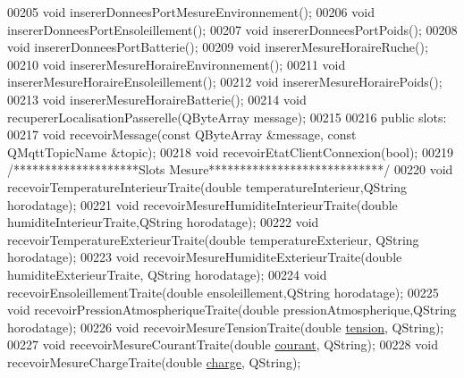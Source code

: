 \begin{DoxyCode}
00205         \textcolor{keywordtype}{void} insererDonneesPortMesureEnvironnement();
00206         \textcolor{keywordtype}{void} insererDonneesPortEnsoleillement();
00207         \textcolor{keywordtype}{void} insererDonneesPortPoids();
00208         \textcolor{keywordtype}{void} insererDonneesPortBatterie();
00209         \textcolor{keywordtype}{void} insererMesureHoraireRuche();
00210         \textcolor{keywordtype}{void} insererMesureHoraireEnvironnement();
00211         \textcolor{keywordtype}{void} insererMesureHoraireEnsoleillement();
00212         \textcolor{keywordtype}{void} insererMesureHorairePoids();
00213         \textcolor{keywordtype}{void} insererMesureHoraireBatterie();
00214         \textcolor{keywordtype}{void} recupererLocalisationPasserelle(QByteArray message);
00215 
00216     \textcolor{keyword}{public} slots:        
00217         \textcolor{keywordtype}{void} recevoirMessage(\textcolor{keyword}{const} QByteArray &message, \textcolor{keyword}{const} QMqttTopicName &topic);
00218         \textcolor{keywordtype}{void} recevoirEtatClientConnexion(\textcolor{keywordtype}{bool});
00219         \textcolor{comment}{/********************Slots Mesure****************************/}
00220         \textcolor{keywordtype}{void} recevoirTemperatureInterieurTraite(\textcolor{keywordtype}{double} temperatureInterieur,QString horodatage);
00221         \textcolor{keywordtype}{void} recevoirMesureHumiditeInterieurTraite(\textcolor{keywordtype}{double} humiditeInterieurTraite,QString horodatage);
00222         \textcolor{keywordtype}{void} recevoirTemperatureExterieurTraite(\textcolor{keywordtype}{double} temperatureExterieur, QString horodatage);
00223         \textcolor{keywordtype}{void} recevoirMesureHumiditeExterieurTraite(\textcolor{keywordtype}{double} humiditeExterieurTraite, QString horodatage);
00224         \textcolor{keywordtype}{void} recevoirEnsoleillementTraite(\textcolor{keywordtype}{double} ensoleillement,QString horodatage);
00225         \textcolor{keywordtype}{void} recevoirPressionAtmospheriqueTraite(\textcolor{keywordtype}{double} pressionAtmospherique,QString horodatage);
00226         \textcolor{keywordtype}{void} recevoirMesureTensionTraite(\textcolor{keywordtype}{double} \hyperlink{struct_donnees_batterie_a1394510ba159a846820452e9e333f38b}{tension}, QString);
00227         \textcolor{keywordtype}{void} recevoirMesureCourantTraite(\textcolor{keywordtype}{double} \hyperlink{struct_donnees_batterie_a7a996ea5eacd6839a8a34dbbe48eb59a}{courant}, QString);
00228         \textcolor{keywordtype}{void} recevoirMesureChargeTraite(\textcolor{keywordtype}{double} \hyperlink{struct_donnees_batterie_a4d3cf76cf1722835a6449bc4a29e761b}{charge}, QString);

\end{DoxyCode}
